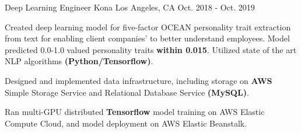 \cventry
    {Deep Learning Engineer} %
    {Kona} %
    {Los Angeles, CA} %
    {Oct. 2018 - Oct. 2019} %
    {
      \begin{cvitems} %
        \item {Created deep learning model for five-factor OCEAN personality trait extraction from text for enabling 
        client companies' to better understand employees. Model predicted 0.0-1.0 valued personality traits \textbf{within 0.015}.
        Utilized state of the art NLP algorithms \textbf{(Python/Tensorflow)}.}
        \item {Designed and implemented data infrastructure, including storage on \textbf{AWS} Simple Storage Service
         and Relational Database Service \textbf{(MySQL)}.
        \item Ran multi-GPU distributed \textbf{Tensorflow} model training on AWS Elastic Compute Cloud, and model deployment on AWS Elastic Beanstalk.}
      \end{cvitems}
    }